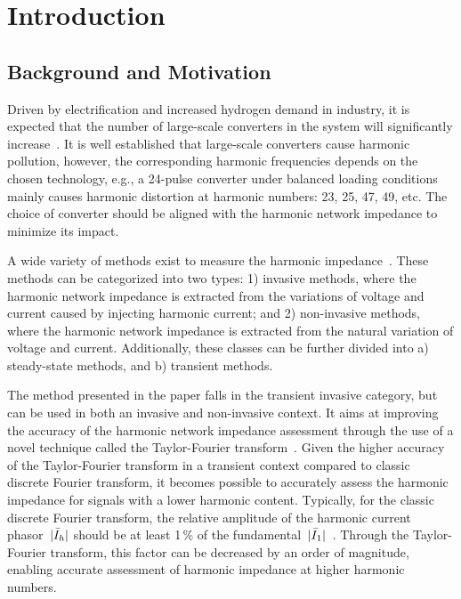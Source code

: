 \section{Introduction}
\label{sec:introduction}

\subsection{Background and Motivation}
\label{sec:background_and_motivation}

Driven by electrification and increased hydrogen demand in industry, it is expected that the number of large-scale converters in the system will significantly increase~\cite{elia_2022}. It is well established that large-scale converters cause harmonic pollution, however, the corresponding harmonic frequencies depends on the chosen technology, e.g., a 24-pulse converter under balanced loading conditions mainly causes harmonic distortion at harmonic numbers: 23, 25, 47, 49, etc. The choice of converter should be aligned with the harmonic network impedance to minimize its impact. 

A wide variety of methods exist to measure the harmonic impedance~\cite{robert_1997}. These methods can be categorized into two types: 1) invasive methods, where the harmonic network impedance is extracted from the variations of voltage and current caused by injecting harmonic current; and 2) non-invasive methods, where the harmonic network impedance is extracted from the natural variation of voltage and current. Additionally, these classes can be further divided into a) steady-state methods, and b) transient methods.

The method presented in the paper falls in the transient invasive category, but can be used in both an invasive and non-invasive context. It aims at improving the accuracy of the harmonic network impedance assessment through the use of a novel technique called the Taylor-Fourier transform~\cite{platas_garza_2011}. Given the higher accuracy of the Taylor-Fourier transform in a transient context compared to classic discrete Fourier transform, it becomes possible to accurately assess the harmonic impedance for signals with a lower harmonic content. Typically, for the classic discrete Fourier transform, the relative amplitude of the harmonic current phasor~$|\bar{I}_{h}|$ should be at least 1\,\% of the fundamental~$|\bar{I}_{1}|$~\cite{xi_2002}. Through the Taylor-Fourier transform, this factor can be decreased by an order of magnitude, enabling accurate assessment of harmonic impedance at higher harmonic numbers.


